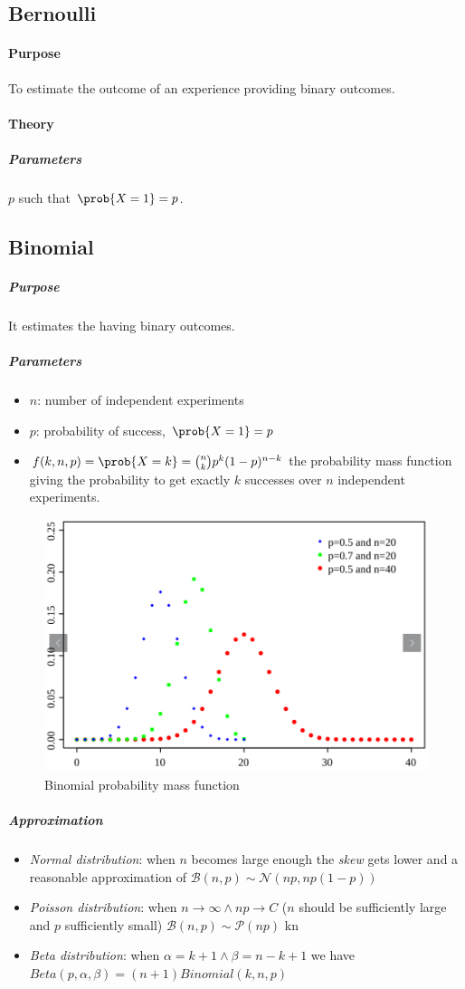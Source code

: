\subsection{Bernoulli}
\paragraph{Purpose}
To estimate the outcome of an experience providing binary outcomes.
\paragraph{Theory}
\subparagraph{Parameters}
$p$ such that $\prob{X=1} = p$.
\subsection{Binomial}
\subparagraph{Purpose}
It estimates the  having binary
outcomes.
\subparagraph{Parameters}
\begin{itemize}
    \item $n$: number of independent experiments
    \item $p$: probability of success, $\prob{X=1} = p$
    \item $f(k, n, p) = \prob{X=k} = \binom{n}{k}p^{k}(1-p)^{n-k}$ the probability mass function
        giving the probability to get exactly $k$ successes over $n$ independent experiments.
\end{itemize}

\begin{figure}[H]
    \begin{center}
        \includegraphics[width=.5\textwidth]{./chapters/2_statistics/02_common_probability_distributions/images/01_binomial_pmf.png}
    \end{center}
    \caption{Binomial probability mass function}
    \label{fig:01_binomial_pmf}
\end{figure}

\subparagraph{Approximation}
\begin{itemize}
    \item \emph{Normal distribution}: when $n$ becomes large enough the \emph{skew} gets lower and
        a reasonable approximation of $\mathcal{B}(n, p) \sim \mathcal{N}\left(np, np(1-p)\right)$
    \item \emph{Poisson distribution}: when $n\rightarrow\infty \wedge np\rightarrow C$ ($n$ should 
        be sufficiently large and $p$ sufficiently small)
        $\mathcal{B}(n, p) \sim \mathcal{P}(np)$ kn
    \item \emph{Beta distribution}: when $\alpha=k+1 \wedge \beta=n-k+1$ we have 
        $Beta(p,\alpha,\beta) = (n+1)Binomial(k, n, p)$
\end{itemize}

